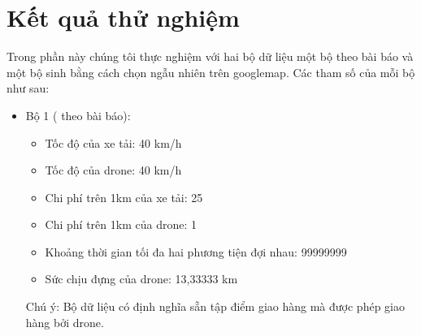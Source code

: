 \documentclass[a4paper,12pt]{report}
\begin{document}
\chapter{Kết quả thử nghiệm}
Trong phần này chúng tôi thực nghiệm với hai bộ dữ liệu một bộ theo bài báo \cite{main} và một bộ sinh bằng cách chọn ngẫu nhiên trên googlemap. Các tham số của mỗi bộ như sau:
\begin{itemize}
\item Bộ 1 ( theo bài báo): 
\begin{itemize}
\item Tốc độ của xe tải: 40 km/h
\item Tốc độ của drone: 40 km/h
\item Chi phí trên 1km của xe tải: 25
\item Chi phí trên 1km của drone: 1
\item Khoảng thời gian tối đa hai phương tiện đợi nhau: 99999999
\item Sức chịu đựng của drone: 13,33333 km
\end{itemize}
Chú ý: Bộ dữ liệu có định nghĩa sẵn tập điểm giao hàng mà được phép giao hàng bởi drone.
\end{itemize}
\end{document}
